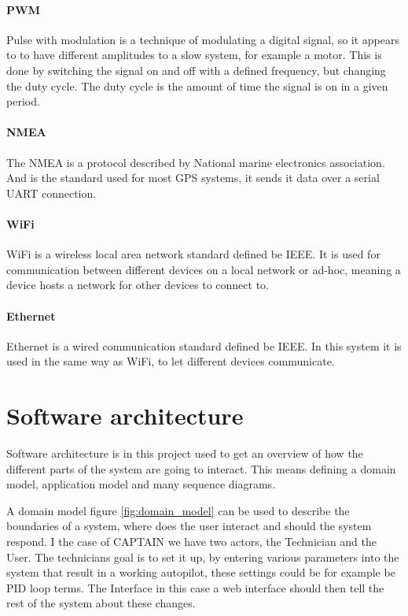 \paragraph{PWM}
Pulse with modulation is a technique of modulating a digital signal, so it appears to to have different amplitudes to a slow system, for example a motor. This is done by switching the signal on and off with a defined frequency, but changing the duty cycle. The duty cycle is the amount of time the signal is on in a given period.\cite{PWM}

\paragraph{NMEA}
The NMEA is a protocol described by National marine electronics association. And is the standard used for most GPS systems, it sends it data over a serial UART connection. \cite{NMEA}

\paragraph{WiFi}
WiFi is a wireless local area network standard defined be IEEE\cite{WIFI}. It is used for communication between different devices on a local network or ad-hoc, meaning a device hosts a network for other devices to connect to. 

\paragraph{Ethernet}
Ethernet is a wired communication standard defined be IEEE\cite{ethernet}. In this system it is used in the same way as WiFi, to let different devices communicate.

\section{Software architecture}
\label{sec:soft-architecture}
Software architecture is in this project used to get an overview of how the different parts of the system are going to interact.
This means defining a domain model, application model and many sequence diagrams. 

A domain model figure \ref{fig:domain_model} can be used to describe the boundaries of a system, where does the user interact and should the system respond. I the case of CAPTAIN we have two actors, the Technician and the User. The technicians goal is to set it up, by entering various parameters into the system that result in a working autopilot, these settings could be for example be PID loop terms. The Interface in this case a web interface should then tell the rest of the system about these changes.

